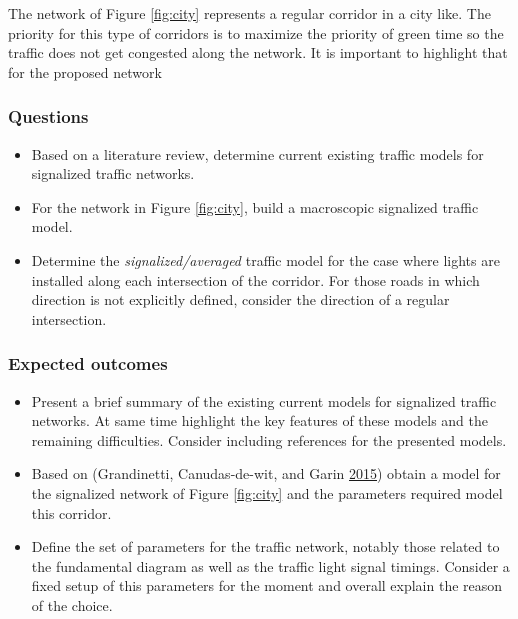 \documentclass[]{book}
\providecommand{\tightlist}{%
  \setlength{\itemsep}{0pt}\setlength{\parskip}{0pt}}
\theoremstyle{definition}
\theoremstyle{definition}
\theoremstyle{definition}
\theoremstyle{remark}
\begin{document}
The network of Figure \ref{fig:city} represents a regular corridor in a
city like. The priority for this type of corridors is to maximize the
priority of green time so the traffic does not get congested along the
network. It is important to highlight that for the proposed network

\hypertarget{questions}{%
\subsubsection*{Questions}\label{questions}}

\begin{itemize}
\tightlist
\item
  Based on a literature review, determine current existing traffic
  models for signalized traffic networks.
\item
  For the network in Figure \ref{fig:city}, build a macroscopic
  signalized traffic model.
\item
  Determine the \emph{signalized/averaged} traffic model for the case
  where lights are installed along each intersection of the corridor.
  For those roads in which direction is not explicitly defined, consider
  the direction of a regular intersection.
\end{itemize}

\hypertarget{expected-outcomes}{%
\subsubsection*{Expected outcomes}\label{expected-outcomes}}

\begin{itemize}
\item
  Present a brief summary of the existing current models for signalized
  traffic networks. At same time highlight the key features of these
  models and the remaining difficulties. Consider including references
  for the presented models.
\item
  Based on (Grandinetti, Canudas-de-wit, and Garin
  \protect\hyperlink{ref-Grandinetti2015}{2015}) obtain a model for the
  signalized network of Figure \ref{fig:city} and the parameters
  required model this corridor.
\item
  Define the set of parameters for the traffic network, notably those
  related to the fundamental diagram as well as the traffic light signal
  timings. Consider a fixed setup of this parameters for the moment and
  overall explain the reason of the choice.
\end{itemize}
\end{document}
